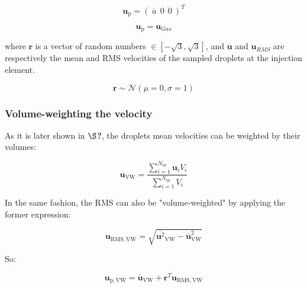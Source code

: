\begin{equation}
\boldsymbol{u}_\mathrm{p} = \left( ~ \overline{u} ~~ 0 ~~ 0 ~ \right)^T
\end{equation}

\begin{equation}
\boldsymbol{u}_\mathrm{p}= \boldsymbol{u}_{Gas}
\end{equation}

where $\boldsymbol{r}$ is a vector of random numbers $\in [-\sqrt{3}, \sqrt{3}]$, and $\overline{\boldsymbol{u}}$ and $\boldsymbol{u}_{RMS}$ are respectively the mean and RMS velocities of the sampled droplets at the injection element.

\begin{equation}
\boldsymbol{r} \sim \mathcal{N} \left( \mu = 0, \sigma = 1 \right)
\end{equation}

\subsubsection*{Volume-weighting the velocity}

As it is later shown in $\S$\textbf{?}, the droplets mean velocities can be weighted by their volumes:


\begin{equation}
\displaystyle \overline{ \textbf{u} }_\mathrm{VW} = \frac{\sum_{i=1}^{N_\mathrm{dr}} \textbf{u}_i V_i}{\sum_{i=1}^{N_\mathrm{dr}} V_i}
\end{equation}

In the same fashion, the RMS can also be "volume-weighted" by applying the former expression:

\begin{equation}
\textbf{u}_\mathrm{RMS,VW} = \sqrt{\displaystyle \overline{\textbf{u}^2 }_\mathrm{VW} - \displaystyle \overline{\textbf{u} }_\mathrm{VW}^2}
\end{equation}

So:

\begin{equation}
\boldsymbol{u}_\mathrm{p,VW} = \overline{\boldsymbol{u}}_\mathrm{VW}  + \boldsymbol{r}^T \boldsymbol{u}_\mathrm{RMS,VW} 
\end{equation}




